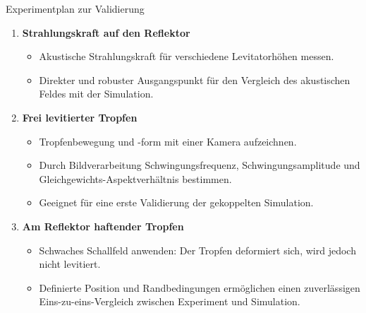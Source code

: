 \documentclass[
	german,%
	accentcolor=9c,%
	accept-missing-logos=true,%
]{tudabeamer}
\begin{document}
\begin{frame}{Experimentplan zur Validierung}
    \begin{enumerate}
        \item \textbf{Strahlungskraft auf den Reflektor}
        \begin{itemize}
            \item Akustische Strahlungskraft für verschiedene Levitatorhöhen messen.
            \item Direkter und robuster Ausgangspunkt für den Vergleich des
            akustischen Feldes mit der Simulation.
        \end{itemize}
        \item \textbf{Frei levitierter Tropfen}
        \begin{itemize}
            \item Tropfenbewegung und -form mit einer Kamera aufzeichnen.
            \item Durch Bildverarbeitung Schwingungsfrequenz, Schwingungsamplitude
            und Gleichgewichts-Aspektverhältnis bestimmen.
            \item Geeignet für eine erste Validierung der gekoppelten Simulation.
        \end{itemize}
        \item \textbf{Am Reflektor haftender Tropfen}
        \begin{itemize}
            \item Schwaches Schallfeld anwenden: Der Tropfen deformiert sich,
            wird jedoch nicht levitiert.
            \item Definierte Position und Randbedingungen ermöglichen einen
            zuverlässigen Eins-zu-eins-Vergleich zwischen Experiment und Simulation.
        \end{itemize}
    \end{enumerate}
\end{frame}
\end{document}
